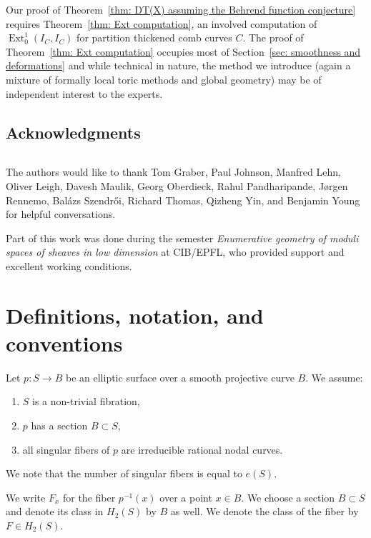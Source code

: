 \documentclass[12pt]{amsart}
\theoremstyle{definition}
\newcommand{\Ext}{\operatorname{Ext}}
\newcommand{\presectionspace}{\vspace{0.2cm}} %
\newcommand{\SubSecSpace}{$\,$\vspace{0.2cm}\par } %
\begin{document}
Our proof of Theorem~\ref{thm: DT(X) assuming the Behrend
function conjecture} requires Theorem~\ref{thm: Ext computation}, an
involved computation of $\Ext^{1}_{0}(I_{C},I_{C})$ for partition
thickened comb curves $C$. The proof of Theorem~\ref{thm: Ext
computation} occupies most of Section~\ref{sec: smoothness and
deformations} and while technical in nature, the method we introduce
(again a mixture of formally local toric methods and global geometry)
may be of independent interest to the experts.

\subsection{Acknowledgments}
\SubSecSpace

The authors would like to thank Tom Graber, Paul Johnson, Manfred
Lehn, Oliver Leigh, Davesh Maulik, Georg Oberdieck, Rahul
Pandharipande, J{\o}rgen Rennemo, Bal\'azs Szendr\H{o}i, Richard
Thomas, Qizheng Yin, and Benjamin Young for helpful conversations.

Part of this work was done during the semester \emph{Enumerative geometry 
of moduli spaces of sheaves in low dimension} at CIB/EPFL, who 
provided support and excellent working conditions.






\presectionspace
\section{Definitions, notation, and conventions} \label{defnotcon}

Let $p : S \rightarrow B$ be an elliptic surface over a smooth
projective curve $B$. We assume:
\begin{enumerate}
\item $S$ is a non-trivial fibration,
\item $p$ has a section $B \subset S$,
\item all singular fibers of $p$ are irreducible rational nodal curves. 
\end{enumerate}
We note that the number of singular fibers is equal to $e(S)$.

We write $F_x$ for the fiber $p^{-1}(x)$ over a  point $x \in
B$. We choose a section $B \subset S$ and denote its class in $H_2(S)$
by $B$ as well. We denote the class of the fiber by $F \in H_2(S)$.
\end{document}
